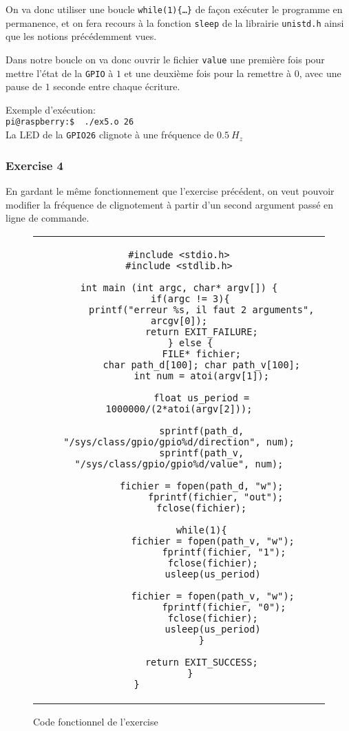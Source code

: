 \documentclass[11pt, openright]{book}
\begin{document}
On va donc utiliser une boucle \texttt{while(1)\{\ldots\}} de façon exécuter le programme en permanence, et on fera recours à la fonction \texttt{sleep} de la librairie \texttt{unistd.h} ainsi que les notions précédemment vues.

Dans notre boucle on va donc ouvrir le fichier \texttt{value} une première fois pour mettre l'état de la \texttt{GPIO} à $1$ et une deuxième fois pour la remettre à $0$, avec une pause de $1$ seconde entre chaque écriture.

Exemple d'exécution:\\
\texttt{pi@raspberry:\text{$\sim$}\$ \ ./ex5.o 26}\\
La LED de la \texttt{GPIO26} clignote à une fréquence de $0.5\ H_z$

\subsubsection{Exercise 4}

En gardant le même fonctionnement que l'exercise précédent, on veut pouvoir modifier la fréquence de clignotement à partir d'un second argument passé en ligne de commande.

\newpage

\begin{figure}[ht!]
	\centering
	\begin{tabular}{c}
		\begin{lstlisting}
#include <stdio.h>
#include <stdlib.h>

int main (int argc, char* argv[]) {
    if(argc != 3){
        printf("erreur %s, il faut 2 arguments", arcgv[0]);
        return EXIT_FAILURE;
    } else {
        FILE* fichier;
        char path_d[100]; char path_v[100];
	 	int num = atoi(argv[1]);

        float us_period = 1000000/(2*atoi(argv[2]));
    
        sprintf(path_d, "/sys/class/gpio/gpio%d/direction", num);
        sprintf(path_v, "/sys/class/gpio/gpio%d/value", num);

        fichier = fopen(path_d, "w");
             fprintf(fichier, "out");
        fclose(fichier);

        while(1){
            fichier = fopen(path_v, "w");
                fprintf(fichier, "1");
            fclose(fichier);
            usleep(us_period)

            fichier = fopen(path_v, "w");
                fprintf(fichier, "0");
            fclose(fichier);
			usleep(us_period)
        }

        return EXIT_SUCCESS;
    }
}				\end{lstlisting}
	\end{tabular}
	\caption{Code fonctionnel de l'exercise }
\end{figure}
\end{document}
